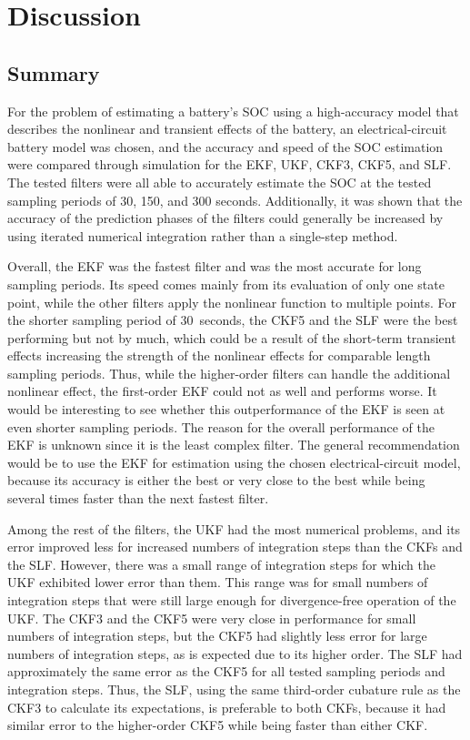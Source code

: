 \documentclass[../zhang_thesis.tex]{subfiles}
\begin{document}
\chapter{Discussion}


\section{Summary}

For the problem of estimating a battery's SOC using a high-accuracy model that describes the nonlinear and transient effects of the battery, an electrical-circuit battery model was chosen, and the accuracy and speed of the SOC estimation were compared through simulation for the EKF, UKF, CKF3, CKF5, and SLF. The tested filters were all
able to accurately estimate the SOC at the tested sampling periods of 30, 150, and 300 seconds. Additionally, it was shown that the accuracy of the prediction phases of the filters could generally be increased by using iterated numerical integration rather than a single-step method.

Overall, the EKF was the fastest filter and was the most accurate for long sampling periods. Its speed comes mainly from its evaluation of only one state point, while the other filters apply the nonlinear function to multiple points. For the shorter sampling period of 30~seconds, the CKF5 and the SLF were the best performing but not by much, which could be a result of the short-term transient effects increasing the strength of the nonlinear effects for comparable length sampling periods. Thus, while
the higher-order filters can handle the additional nonlinear effect, the first-order EKF could not as well and performs worse. It would be interesting to see whether this outperformance of the EKF is seen at even shorter sampling periods. The reason for the overall performance of the EKF is unknown since it is the least complex filter. The general recommendation would be to use the EKF for estimation using the chosen electrical-circuit model, because its accuracy is either the best or very close to the best while being several
times faster than the next fastest filter.

Among the rest of the filters, the UKF had the most numerical problems, and its error improved less for increased numbers of integration steps than the CKFs and the SLF. However, there was a small range of integration steps for which the UKF exhibited lower error than them. This range was for small numbers of integration steps that were still large enough for divergence-free operation of the UKF. The CKF3 and the CKF5 were very close in performance for small numbers of integration steps,
but the CKF5 had slightly less error for large numbers of integration steps, as is expected due to its higher order. The SLF had approximately the same error as the CKF5 for all tested sampling periods and integration steps. Thus, the SLF, using the same third-order cubature rule as the CKF3 to calculate its expectations, is preferable to both CKFs, because it had similar error to the higher-order CKF5 while being faster than either CKF.
\end{document}

